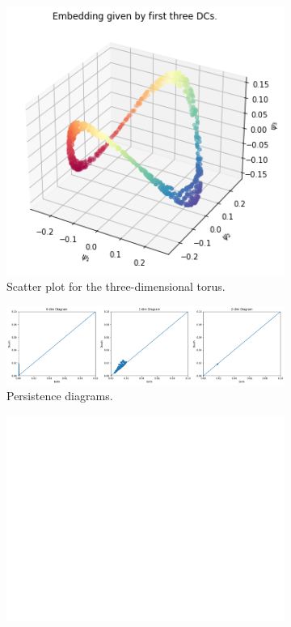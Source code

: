 \begin{figure}[H]
\centering
\begin{subfigure}[b]{0.2\textwidth}
    \includegraphics[width=\textwidth]{figures/torus.png}
    \caption{Scatter plot for the three-dimensional torus.}
\end{subfigure}
\hfill
\begin{subfigure}[b]{0.75\textwidth}
    \includegraphics[width=\textwidth]{figures/torus_Hk.png}
    \caption{Persistence diagrams.}
\end{subfigure}
\begin{subfigure}[b]{0.25\textwidth}
\includegraphics[width=\textwidth]{figures/white.png} 

\end{subfigure}
\end{figure}
